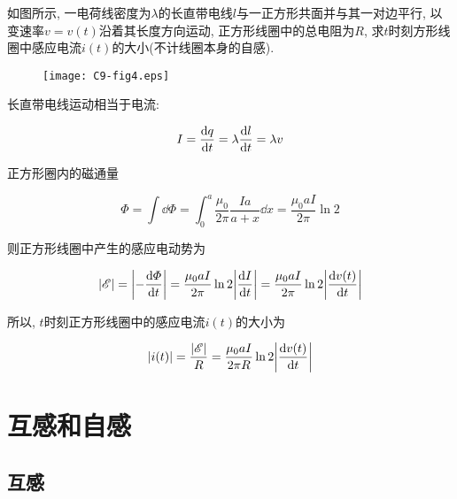 \begin{example}
	如图所示, 一电荷线密度为$\lambda$的长直带电线$l$与一正方形共面并与其一对边平行, 以变速率$v = v(t)$沿着其长度方向运动, 正方形线圈中的总电阻为$R$, 求$t$时刻方形线圈中感应电流$i(t)$的大小(不计线圈本身的自感).
	
	\begin{figure}[H]
		\centering
		\texttt{[image: C9-fig4.eps]}
	\end{figure}
	
	\begin{solution}
		
		长直带电线运动相当于电流: 
		
		\begin{equation*}
			I = \dv{q}{t} = \lambda \dv{l}{t} = \lambda v
		\end{equation*}
				
		正方形圈内的磁通量
		
		\begin{equation*}
			\varPhi = \int \dd{\varPhi} = \int_{0}^{a} \dfrac{\mu_0}{2 \pi} \dfrac{I a}{a+x} \dd{x} = \dfrac{\mu_0 a I}{2 \pi} \ln 2 
		\end{equation*}
		
		则正方形线圈中产生的感应电动势为
		
		\begin{equation*}
			\abs{\mathscr{E}} = \abs{-\dv{\varPhi}{t}} = \dfrac{\mu_0 a I}{2 \pi} \ln 2 \abs{\dv{I}{t}} = \dfrac{\mu_0 a I}{2 \pi} \ln 2 \abs{\dv{v(t)}{t}}
		\end{equation*}
		
		所以, $t$时刻正方形线圈中的感应电流$i(t)$的大小为
		
		\begin{equation*}
			\abs{i(t)} = \dfrac{\abs{\mathscr{E}}}{R} = \dfrac{\mu_0 a I}{2 \pi R} \ln 2 \abs{\dv{v(t)}{t}}
		\end{equation*}
		
	\end{solution}
	
\end{example}

\section{互感和自感}\label{9.3}

\subsection{互感}

